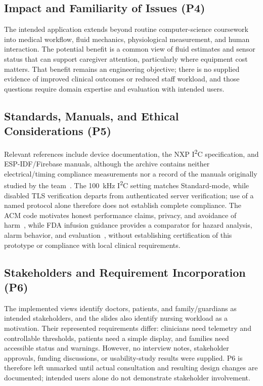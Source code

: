 \subsection{Impact and Familiarity of Issues (P4)}
The intended application extends beyond routine computer-science coursework into medical workflow, fluid mechanics, physiological measurement, and human interaction. The potential benefit is a common view of fluid estimates and sensor status that can support caregiver attention, particularly where equipment cost matters. That benefit remains an engineering objective; there is no supplied evidence of improved clinical outcomes or reduced staff workload, and those questions require domain expertise and evaluation with intended users.

\subsection{Standards, Manuals, and Ethical Considerations (P5)}
Relevant references include device documentation, the NXP I\textsuperscript{2}C specification, and ESP-IDF/Firebase manuals, although the archive contains neither electrical/timing compliance measurements nor a record of the manuals originally studied by the team~\cite{max30102,ad8232,i2cmanual,idfhttp,firebaserules}. The 100~kHz I\textsuperscript{2}C setting matches Standard-mode, while disabled TLS verification departs from authenticated server verification; use of a named protocol alone therefore does not establish complete compliance. The ACM code motivates honest performance claims, privacy, and avoidance of harm~\cite{acmethics}, while FDA infusion guidance provides a comparator for hazard analysis, alarm behavior, and evaluation~\cite{fdaguidance}, without establishing certification of this prototype or compliance with local clinical requirements.

\subsection{Stakeholders and Requirement Incorporation (P6)}
The implemented views identify doctors, patients, and family/guardians as intended stakeholders, and the slides also identify nursing workload as a motivation. Their represented requirements differ: clinicians need telemetry and controllable thresholds, patients need a simple display, and families need accessible status and warnings. However, no interview notes, stakeholder approvals, funding discussions, or usability-study results were supplied. P6 is therefore left unmarked until actual consultation and resulting design changes are documented; intended users alone do not demonstrate stakeholder involvement.

